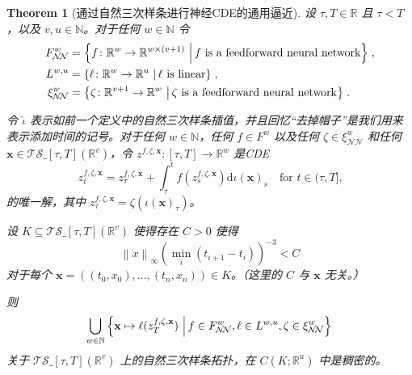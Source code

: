 \documentclass{ctexart}
\theoremstyle{plain}
\newtheorem{thm}{Theorem}[section]
\theoremstyle{definition}
\newcommand{\ts}[2]{\mathcal{T\!S}\_{#1}\left(#2\right)}
\newcommand{\norm}[1]{\left\|#1\right\|}
\newcommand{\reals}{\mathbb{R}}
\newcommand{\naturals}{\mathbb{N}}
\newcommand{\set}[2]{\left\{{#1}\,\left\vert\,{#2}\vphantom{{#1}}\right\}\right.}
\begin{document}
\begin{thm}[通过自然三次样条进行神经CDE的通用逼近]\label{thm:datawise-universal-approximation}
	设 $\tau, T \in \reals$ 且 $\tau < T$，以及 $v, u \in \naturals$。对于任何 $w \in \naturals$ 令
\begin{align*}
	F^w_{\mathcal{N\!N}} &= \set{f \colon \reals^w \to \reals^{w \times (v + 1)}}{f \text{ is a feedforward neural network}},\\
	L^{w, u} &= \set{\ell \colon \reals^w \to \reals^u}{\ell \text{ is linear}},\\
	\xi^w_{\mathcal{N\!N}}&= \set{\zeta \colon \reals^{v + 1} \to \reals^w}{\zeta \text{ is a feedforward neural network}}.
\end{align*}
	
	令 $\widehat{\iota}$ 表示如前一个定义中的自然三次样条插值，并且回忆“去掉帽子”是我们用来表示添加时间的记号。对于任何 $w \in \naturals$，任何 $f \in F^w$ 以及任何 $\zeta \in \xi^w_{\mathcal{N\!N}}$ 和任何 $\mathbf{x} \in \ts{[\tau, T]}{\reals^v}$，令 $z^{f, \zeta, \mathbf{x}} \colon [\tau, T] \to \reals^w$ 是CDE
\begin{equation*}
	z^{f, \zeta, \mathbf{x}}_t = z^{f, \zeta, \mathbf{x}}_\tau + \int_\tau^t f(z^{f, \zeta, \mathbf{x}}_s) \mathrm{d}\iota(\mathbf{x})_s\quad\text{for $t \in (\tau, T]$,}
\end{equation*}
	的唯一解，其中 $z^{f, \zeta, \mathbf{x}}_\tau = \zeta(\iota(\mathbf{x})_\tau)$。
	
	设 $K \subseteq \ts{[\tau, T]}{\reals^v}$ 使得存在 $C > 0$ 使得
\begin{equation}
	\norm{x}_\infty (\min_i (t_{i + 1}-t_i))^{-3} < C \label{eq:compact-require}
\end{equation}
	对于每个 $\mathbf{x} = ((t_0, x_0), \ldots, (t_n, x_n)) \in K$。（这里的 $C$ 与 $\mathbf{x}$ 无关。）
	
	则
\begin{equation*}
	\bigcup_{w \in \naturals} \set{\mathbf{x} \mapsto \ell(z^{f, \zeta, \mathbf{x}}_T)}{f \in F^w_{\mathcal{N\!N}}, \ell \in L^{w, u}, \zeta \in \xi^w_{\mathcal{N\!N}}}
\end{equation*}
	关于 $\ts{[\tau, T]}{\reals^v}$ 上的自然三次样条拓扑，在 $C(K; \reals^u)$ 中是稠密的。
\end{thm}
\end{document}
